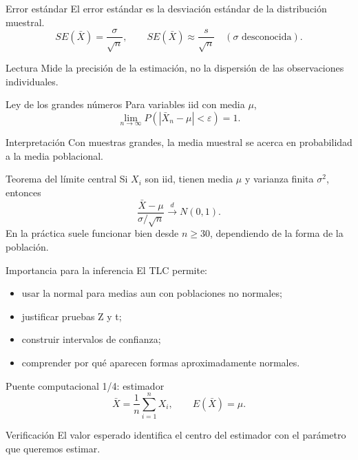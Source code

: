 \documentclass[10pt,aspectratio=169]{beamer}
\begin{document}
\begin{frame}{Error estándar}
  \footnotesize
  El error estándar es la desviación estándar de la distribución muestral.
  \[
    SE(\bar X)=\frac{\sigma}{\sqrt n},
    \qquad SE(\bar X)\approx\frac{s}{\sqrt n}\quad(\sigma\text{ desconocida}).
  \]
  \begin{alertblock}{Lectura}
    Mide la precisión de la estimación, no la dispersión de las observaciones
    individuales.
  \end{alertblock}
\end{frame}

\begin{frame}{Ley de los grandes números}
  \footnotesize
  Para variables iid con media $\mu$,
  \[
    \lim_{n\to\infty}P(|\bar X_n-\mu|<\varepsilon)=1.
  \]
  \begin{block}{Interpretación}
    Con muestras grandes, la media muestral se acerca en probabilidad a la
    media poblacional.
  \end{block}
\end{frame}

\begin{frame}{Teorema del límite central}
  \footnotesize
  Si $X_i$ son iid, tienen media $\mu$ y varianza finita $\sigma^2$, entonces
  \[
    \frac{\bar X-\mu}{\sigma/\sqrt n}\xrightarrow{d}N(0,1).
  \]
  En la práctica suele funcionar bien desde $n\ge30$, dependiendo de la forma
  de la población.
\end{frame}

\begin{frame}{Importancia para la inferencia}
  \footnotesize
  El TLC permite:
  \begin{itemize}\itemsep=0.1cm
    \item usar la normal para medias aun con poblaciones no normales;
    \item justificar pruebas Z y t;
    \item construir intervalos de confianza;
    \item comprender por qué aparecen formas aproximadamente normales.
  \end{itemize}
\end{frame}

\begin{frame}{Puente computacional 1/4: estimador}
  \footnotesize
  \[
    \bar X=\frac1n\sum_{i=1}^nX_i,
    \qquad E(\bar X)=\mu.
  \]
  \begin{block}{Verificación}
    El valor esperado identifica el centro del estimador con el parámetro que
    queremos estimar.
  \end{block}
\end{frame}
\end{document}
